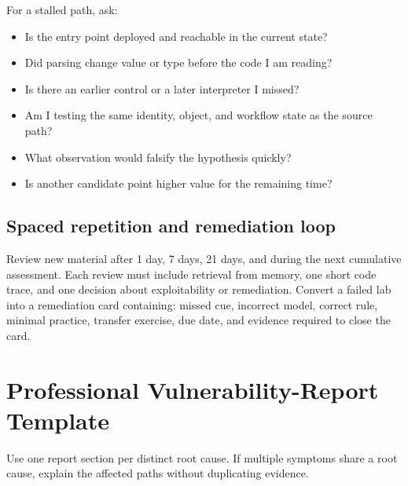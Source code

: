 \documentclass[11pt]{article}
\begin{document}
For a stalled path, ask:
\begin{itemize}
  \item Is the entry point deployed and reachable in the current state?
  \item Did parsing change value or type before the code I am reading?
  \item Is there an earlier control or a later interpreter I missed?
  \item Am I testing the same identity, object, and workflow state as the source path?
  \item What observation would falsify the hypothesis quickly?
  \item Is another candidate point higher value for the remaining time?
\end{itemize}

\subsection{Spaced repetition and remediation loop}
Review new material after 1 day, 7 days, 21 days, and during the next cumulative
assessment. Each review must include retrieval from memory, one short code trace,
and one decision about exploitability or remediation. Convert a failed lab into a
remediation card containing: missed cue, incorrect model, correct rule, minimal
practice, transfer exercise, due date, and evidence required to close the card.

\section{Professional Vulnerability-Report Template}

Use one report section per distinct root cause. If multiple symptoms share a root
cause, explain the affected paths without duplicating evidence.
\end{document}
